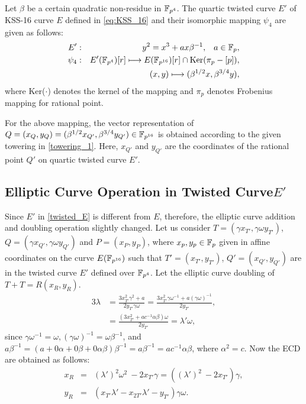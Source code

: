 Let $\beta$ be a certain quadratic non-residue in $\mathbb{F}_{p^4}$.  The quartic twisted curve $E'$ of KSS-16  curve $E$ defined in \eqref{eq:KSS_16} and  their isomorphic mapping $\psi_4$ are given as follows:
\begin{eqnarray} 
E'&:&y^2=x^3+ax\beta^{-1},\;\;\;a\in{\mathbb{F}}_{p}, \label{twisted_E} \\ 
\psi_4&:&E'(\mathbb{F}_{p^4})[r] \longmapsto E(\mathbb{F}_{p^{16}})[r]\cap {\rm Ker}(\pi_p-[p]),\nonumber\\
&& \quad \quad (x,y)\longmapsto (\beta^{1/2}x,\beta^{3/4}y),
\end{eqnarray}
where Ker($\cdot$) denotes the kernel of the mapping and $\pi_p$ denotes Frobenius mapping  for rational point.

For the above mapping, the vector representation of $Q = (x_{Q},y_Q) = (\beta^{1/2}x_{Q'},\beta^{3/4}y_{Q'}) \in \mathbb{F}_{p^{16}}$ is obtained according to the given towering in \eqref{towering_1}.
Here, $x_{Q'}$ and $y_{Q'}$ are the coordinates of the rational point $Q'$ on quartic twisted curve $E'$. 




\subsection{Elliptic Curve Operation in Twisted Curve\texorpdfstring{$E'$}{}}
Since $E'$ in \eqref{twisted_E} is different from $E$, therefore, the elliptic curve addition and doubling operation slightly changed.
Let us consider  $T=(\gamma x_{T'},\gamma \omega y_{T'})$, $Q=(\gamma x_{Q'}, \gamma \omega y_{Q'})$  and  $P=(x_P,y_P) $, where $x_p, y_p \in {\mathbb{F}}_{p}$ given in affine coordinates on the curve $E(\mathbb{F}_{p^{16}})$ such that $T'=(x_{T'},y_{T'})$, $Q'=(x_{Q'},y_{Q'})$ are in the twisted curve $E'$ defined over $\mathbb{F}_{p^4}$.
Let the elliptic curve doubling of $T+T = R(x_R, y_R)$. 
\begin{alignat}{3}
\lambda & =  \frac{ 3x_{T'}^2 \gamma^2+a}{2 y_{T'} \gamma \omega} = \frac{ 3x_{T'}^2 \gamma \omega^{-1}+a (\gamma \omega)^{-1} }{2 y_{T'}}, \nonumber \\
& = \frac{ (3x_{T'}^2 +a c^{-1} \alpha\beta)\omega}{2 y_{T'}} = \lambda' \omega, \nonumber 
\end{alignat}
since  $\gamma \omega^{-1} = \omega, (\gamma \omega)^{-1} = \omega \beta^{-1}$, and $a \beta^{-1} = (a + 0\alpha + 0 \beta + 0 \alpha \beta) \beta ^{-1}=a \beta^{-1} = ac^{-1} \alpha \beta$, where $\alpha^2=c$.
Now the ECD are obtained as follows:
\begin{eqnarray}
x_R &=& (\lambda')^2 \omega^2 \ - 2x_{T'}\gamma   = ((\lambda')^2  \ - 2x_{T'})\gamma, \nonumber \\
y_R &=& (x_{T'}\lambda' -x_{2T'}\lambda'-y_{T'})\gamma \omega \nonumber.
\end{eqnarray}

